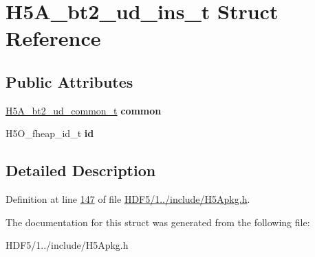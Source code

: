 \hypertarget{struct_h5_a__bt2__ud__ins__t}{}\section{H5\+A\+\_\+bt2\+\_\+ud\+\_\+ins\+\_\+t Struct Reference}
\label{struct_h5_a__bt2__ud__ins__t}
\subsection*{Public Attributes}
\begin{DoxyCompactItemize}
\item 
\mbox{\label{struct_h5_a__bt2__ud__ins__t_a9724d5579b874b4502268ceeef1fc808}} 
\hyperlink{struct_h5_a__bt2__ud__common__t}{H5\+A\+\_\+bt2\+\_\+ud\+\_\+common\+\_\+t} {\bfseries common}
\item 
\mbox{\label{struct_h5_a__bt2__ud__ins__t_aea721b0af071d8d299e95bd3f4f740b4}} 
H5\+O\+\_\+fheap\+\_\+id\+\_\+t {\bfseries id}
\end{DoxyCompactItemize}


\subsection{Detailed Description}


Definition at line \hyperlink{_h_d_f5_21_810_81_2include_2_h5_apkg_8h_source_l00147}{147} of file \hyperlink{_h_d_f5_21_810_81_2include_2_h5_apkg_8h_source}{H\+D\+F5/1../include/\+H5\+Apkg.\+h}.



The documentation for this struct was generated from the following file\+:\begin{DoxyCompactItemize}
\item 
H\+D\+F5/1../include/\+H5\+Apkg.\+h\end{DoxyCompactItemize}
